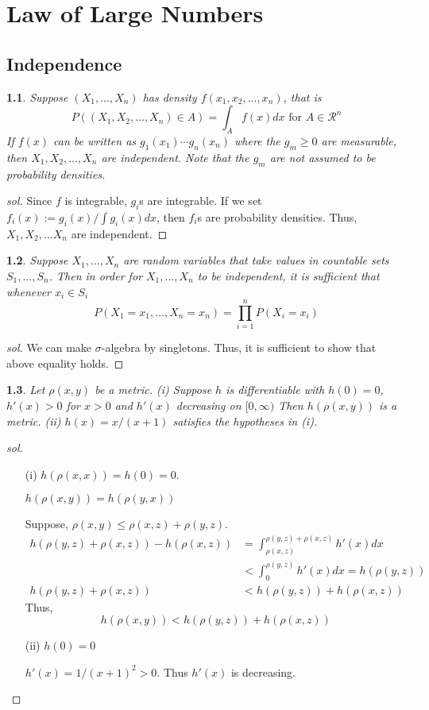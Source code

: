 \documentclass{report}
\newtheorem{ex}{}[section]
\begin{document}
\chapter{Law of Large Numbers}
\section{Independence}
\begin{ex}
Suppose $(X_1,...,X_n)$ has density $f(x_1, x_2,...,x_n)$, that is 
\[P((X_1,X_2,...,X_n) \in A) = \int_A f(x) dx \text{ for } A \in \mathcal{R}^n\]
If $f(x)$ can be written as $g_1(x_1)\dotsb g_n(x_n)$ where the $g_m \ge 0$ are measurable, then $X_1,X_2,...,X_n$ are independent. Note that the $g_m$ are not assumed to be probability densities.
\end{ex}
\begin{proof}[sol]
Since $f$ is integrable, $g_i$s are integrable. If we set $f_i(x) := g_i(x) / \int g_i(x)dx$, then $f_i$s are probability densities. Thus, $X_1,X_2,...X_n$ are independent.
\end{proof}
\begin{ex}
Suppose $X_1,...,X_n$ are random variables that take values in countable sets $S_1,...,S_n$. Then in order for $X_1,...,X_n$ to be independent, it is sufficient that whenever $x_i \in S_i$
\[P(X_1 = x_1,...,X_n = x_n) = \prod_{i=1}^n P(X_i = x_i)\]
\end{ex}
\begin{proof}[sol]
We can make $\sigma$-algebra by singletons. Thus, it is sufficient to show that above equality holds.
\end{proof}
\begin{ex}
Let $\rho(x, y)$ be a metric. (i) Suppose $h$ is differentiable with $h(0) =
0$, $h'(x) > 0$ for $x > 0$ and $h'(x)$ decreasing on $[0,\infty)$ Then $h(\rho(x, y))$ is a metric. (ii) $h(x) = x/(x + 1)$ satisfies the hypotheses in (i).
\end{ex}
\begin{proof}[sol]~
\begin{enumerate}
    \item[(i)]
    $h(\rho(x,x)) = h(0) = 0$.
    
    $h(\rho(x,y)) = h(\rho(y,x))$
    
    Suppose, $\rho(x,y) \le \rho(x,z) + \rho(y,z)$.
    \begin{align*}
        h(\rho(y,z)+\rho(x,z)) - h(\rho(x,z)) &= \int_{\rho(x,z)}^{\rho(y,z)+\rho(x,z)} h'(x)dx\\
        &<\int_0^{\rho(y,z)} h'(x)dx = h(\rho(y,z))\\
        h(\rho(y,z)+\rho(x,z)) &< h(\rho(y,z))+h(\rho(x,z))
    \end{align*}
    Thus,
    \[h(\rho(x,y)) < h(\rho(y,z))+h(\rho(x,z))\]
    \item[(ii)]
    $h(0) = 0$
    
    $h'(x) = 1/(x+1)^2 > 0$. Thus $h'(x)$ is decreasing.
\end{enumerate}
\end{proof}
\end{document}
